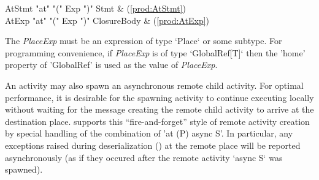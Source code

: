\begin{bbgrammar}
              AtStmt \: \xcd"at" \xcd"(" Exp \xcd")" Stmt & (\ref{prod:AtStmt}) \\
               AtExp \: \xcd"at" \xcd"(" Exp \xcd")" ClosureBody & (\ref{prod:AtExp}) \\
\end{bbgrammar}

The {\it PlaceExp} must be an expression of type \xcd`Place` or some
subtype. For programming convenience, if {\it PlaceExp} is of type
\xcd`GlobalRef[T]` then the \xcd'home' property of \xcd'GlobalRef' is
used as the value of {\it PlaceExp}.

An activity may also spawn an asynchronous remote child activity.  For
optimal performance, it is desirable for the spawning activity to
continue executing locally without waiting for the message creating
the remote child activity to arrive at the destination place. \Xten{}
supports this ``fire-and-forget'' style of remote activity creation by
special handling of the combination of \xcd'at (P) async S'.  In
particular, any exceptions raised during deserialization
() at the remote place will be reported
asynchronously (as if they occured after the remote activity
\xcd`async S` was spawned).



